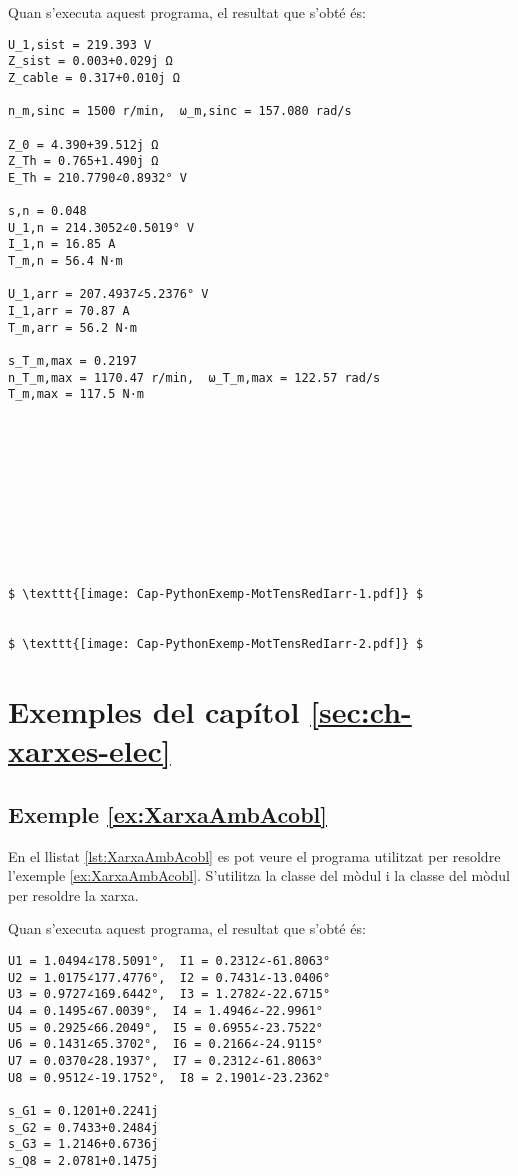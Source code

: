 Quan s'executa aquest programa, el resultat que s'obté és:
\lstset{
	language=,
	numbers=none,
	frame=none
}
\begin{lstlisting}[mathescape=true]
U_1,sist = 219.393 V
Z_sist = 0.003+0.029j Ω
Z_cable = 0.317+0.010j Ω

n_m,sinc = 1500 r/min,  ω_m,sinc = 157.080 rad/s

Z_0 = 4.390+39.512j Ω
Z_Th = 0.765+1.490j Ω
E_Th = 210.7790∠0.8932° V

s,n = 0.048
U_1,n = 214.3052∠0.5019° V
I_1,n = 16.85 A
T_m,n = 56.4 N·m

U_1,arr = 207.4937∠5.2376° V
I_1,arr = 70.87 A
T_m,arr = 56.2 N·m

s_T_m,max = 0.2197
n_T_m,max = 1170.47 r/min,  ω_T_m,max = 122.57 rad/s
T_m,max = 117.5 N·m










	
$ \texttt{[image: Cap-PythonExemp-MotTensRedIarr-1.pdf]} $


$ \texttt{[image: Cap-PythonExemp-MotTensRedIarr-2.pdf]} $
\end{lstlisting} 

\pagebreak





\section{Exemples del capítol \ref*{sec:ch-xarxes-elec}}

\hypertarget{exemple:XarxaAmbAcobl}{\subsection{Exemple \ref*{ex:XarxaAmbAcobl} \XarxaAmbAcobl}}
En el llistat \vref{lst:XarxaAmbAcobl} es pot veure el programa utilitzat per resoldre l'exemple \vref{ex:XarxaAmbAcobl}. S'utilitza la classe  del mòdul  i  la classe  del mòdul  per resoldre la xarxa.


Quan s'executa aquest programa, el resultat que s'obté és:
\lstset{
	language=,
	numbers=none,
	frame=none
}
\begin{lstlisting}
U1 = 1.0494∠178.5091°,  I1 = 0.2312∠-61.8063° 
U2 = 1.0175∠177.4776°,  I2 = 0.7431∠-13.0406° 
U3 = 0.9727∠169.6442°,  I3 = 1.2782∠-22.6715° 
U4 = 0.1495∠67.0039°,  I4 = 1.4946∠-22.9961° 
U5 = 0.2925∠66.2049°,  I5 = 0.6955∠-23.7522° 
U6 = 0.1431∠65.3702°,  I6 = 0.2166∠-24.9115° 
U7 = 0.0370∠28.1937°,  I7 = 0.2312∠-61.8063° 
U8 = 0.9512∠-19.1752°,  I8 = 2.1901∠-23.2362° 

s_G1 = 0.1201+0.2241j
s_G2 = 0.7433+0.2484j
s_G3 = 1.2146+0.6736j
s_Q8 = 2.0781+0.1475j
\end{lstlisting} 


